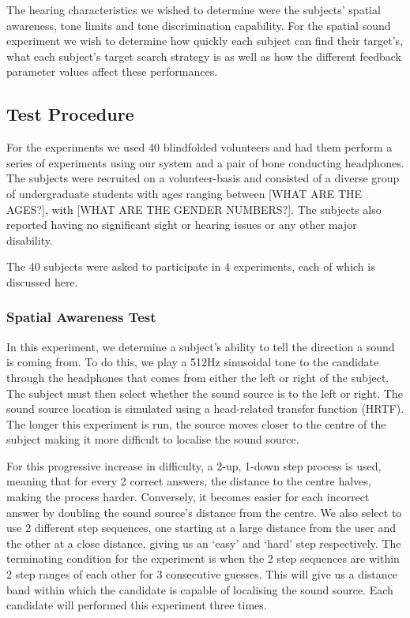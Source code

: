 \documentclass[format=sigconf, review=true, screen=true, anonymous=true]{acmart}
\begin{document}
The hearing characteristics we wished to determine were the subjects' spatial awareness, tone limits and tone discrimination capability. For the spatial sound experiment we wish to determine how quickly each subject can find their target's, what each subject's target search strategy is as well as how the different feedback parameter values affect these performances. 

\subsection{Test Procedure}

For the experiments we used 40 blindfolded volunteers and had them perform a series of experiments using our system and a pair of bone conducting headphones. The subjects were recruited on a volunteer-basis and consisted of a diverse group of undergraduate students with ages ranging between [WHAT ARE THE AGES?], with [WHAT ARE THE GENDER NUMBERS?]. The subjects also reported having no significant sight or hearing issues or any other major disability. 

The 40 subjects were asked to participate in 4 experiments, each of which is discussed here.

\subsubsection{Spatial Awareness Test}

In this experiment, we determine a subject's ability to tell the direction a sound is coming from. To do this, we play a 512Hz sinusoidal tone to the candidate through the headphones that comes from either the left or right of the subject. The subject must then select whether the sound source is to the left or right. The sound source location is simulated using a head-related transfer function (HRTF). The longer this experiment is run, the source moves closer to the centre of the subject making it more difficult to localise the sound source. 

For this progressive increase in difficulty, a 2-up, 1-down step process is used, meaning that for every 2 correct answers, the distance to the centre halves, making the process harder. Conversely, it becomes easier for each incorrect answer by doubling the sound source's distance from the centre. We also select to use 2 different step sequences, one starting at a large distance from the user and the other at a close distance, giving us an `easy' and `hard' step respectively. The terminating condition for the experiment is when the 2 step sequences are within 2 step ranges of each other for 3 consecutive guesses. This will give us a distance band within which the candidate is capable of localising the sound source. Each candidate will performed this experiment three times. 
\end{document}
